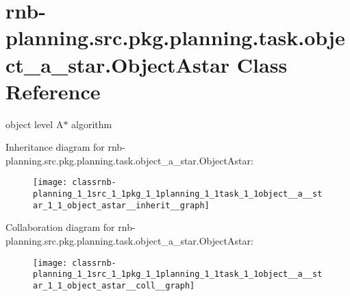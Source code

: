 \hypertarget{classrnb-planning_1_1src_1_1pkg_1_1planning_1_1task_1_1object__a__star_1_1_object_astar}{}\section{rnb-\/planning.src.\+pkg.\+planning.\+task.\+object\+\_\+a\+\_\+star.\+Object\+Astar Class Reference}
\label{classrnb-planning_1_1src_1_1pkg_1_1planning_1_1task_1_1object__a__star_1_1_object_astar}


object level A$\ast$ algorithm  




Inheritance diagram for rnb-\/planning.src.\+pkg.\+planning.\+task.\+object\+\_\+a\+\_\+star.\+Object\+Astar\+:
\nopagebreak
\begin{figure}[H]
\begin{center}
\leavevmode
\texttt{[image: classrnb-planning\_1\_1src\_1\_1pkg\_1\_1planning\_1\_1task\_1\_1object\_\_a\_\_star\_1\_1\_object\_astar\_\_inherit\_\_graph]}
\end{center}
\end{figure}


Collaboration diagram for rnb-\/planning.src.\+pkg.\+planning.\+task.\+object\+\_\+a\+\_\+star.\+Object\+Astar\+:
\nopagebreak
\begin{figure}[H]
\begin{center}
\leavevmode
\texttt{[image: classrnb-planning\_1\_1src\_1\_1pkg\_1\_1planning\_1\_1task\_1\_1object\_\_a\_\_star\_1\_1\_object\_astar\_\_coll\_\_graph]}
\end{center}
\end{figure}
